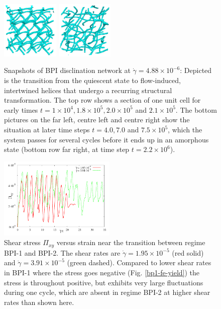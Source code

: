 \documentclass[aps,pre,reprint,superscriptaddress, twocolumn]{revtex4}
\newcommand{\e}[1]{\times10^{#1}}
\newcommand{\gd}{\dot{\gamma}}
\begin{document}
\begin{figure}[htpb]
\includegraphics[width=0.245\textwidth]{disc-xy-750k_run1115.png}
\includegraphics[width=0.245\textwidth]{disc-xy-2200k_run1115.png}
\caption{Snapshots of BPI disclination network at $\dot{\gamma}=4.88\e{-6}$: 
Depicted is the transition from the quiescent state to flow-induced, intertwined 
helices that undergo a recurring structural transformation. The top row
shows a section of one unit cell for early times 
$t=1\e{4}, 1.8\e{5}, 2.0\e{5}$ and $2.1\e{5}$. The bottom 
pictures on the far left, centre left and centre right 
show the situation at later time steps $t=4.0, 7.0$ and $7.5\e{5}$,
which the system passes for several cycles before it ends up in
an amorphous state (bottom row far right, at time step $t=2.2\e{6}$).}
\label{bp1-low}
\end{figure}

\fi

\begin{figure}[htpb]
\includegraphics[width=0.495\textwidth]{stress_bp1-1_bp1-2.pdf}
\caption{Shear stress $\Pi_{xy}$ versus strain near the transition between regime
BPI-1 and BPI-2. The shear rates are $\gd=1.95\e{-5}$ (red solid) 
and $\gd=3.91\e{-5}$ (green dashed). Compared to lower shear rates in BPI-1 
where the stress goes negative (Fig. \ref{bp1-fe-yield}) the stress is 
throughout positive, but exhibits very large fluctuations during one cycle, 
which are absent in regime BPI-2 at higher shear rates than shown here.}
\label{bp1-1_bp1-2}
\end{figure}
\end{document}
